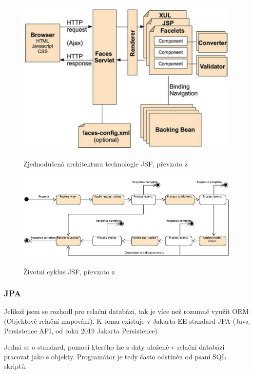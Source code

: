 \documentclass[twoside]{ctuthesis}
\theoremstyle{plain}
\theoremstyle{definition}
\theoremstyle{note}
\begin{document}
\begin{figure}
    \caption{Zjednodušená architektura technologie JSF, převzato z \cite{goncalves_2013}}
    \centering
    \includegraphics[width=\textwidth]{images/jsf-architektura}
    \label{img:jsf-architektura}
\end{figure}

\begin{figure}
    \caption{Životní cyklus JSF, převzato z \cite{goncalves_2013}}
    \centering
    \includegraphics[width=\textwidth]{images/jsf-life-cycle}
    \label{img:jsf-life-cycle}
\end{figure}

\subsubsection{JPA}
Jelikož jsem se rozhodl pro relační databázi, tak je více než rozumné využít ORM (Objektově relační mapování). K tomu existuje v Jakarta EE standard JPA (Java Persistence API, od roku 2019 Jakarta Persistence).

Jedná se o standard, pomocí kterého lze s daty uložené v relační databázi pracovat jako s objekty. Programátor je tedy často odstíněn od psaní SQL skriptů.
\end{document}
